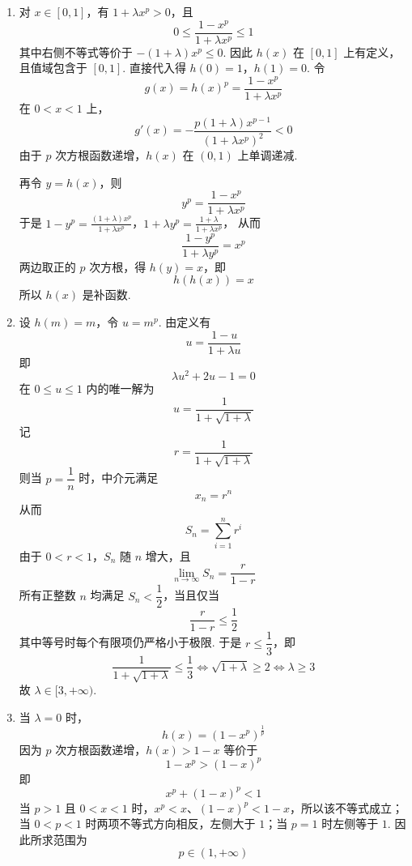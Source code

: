 \begin{solution}
\begin{enumerate}
\item 对 \(x\in[0,1]\)，有 \(1+\lambda x^p>0\)，且
\[
0\leqslant\frac{1-x^p}{1+\lambda x^p}\leqslant1
\]
其中右侧不等式等价于
\(-(1+\lambda)x^p\leqslant0\). 因此 \(h(x)\) 在 \([0,1]\) 上有定义，且值域包含于 \([0,1]\). 直接代入得
\(h(0)=1\)，\(h(1)=0\).
令
\[
g(x)=h(x)^p=\frac{1-x^p}{1+\lambda x^p}
\]
在 \(0<x<1\) 上，
\[
g'(x)
=-\frac{p(1+\lambda)x^{p-1}}{(1+\lambda x^p)^2}<0
\]
由于 \(p\) 次方根函数递增，\(h(x)\) 在 \((0,1)\) 上单调递减.

再令 \(y=h(x)\)，则
\[
y^p=\frac{1-x^p}{1+\lambda x^p}
\]
于是
\(1-y^p=\frac{(1+\lambda)x^p}{1+\lambda x^p}\)，\(1+\lambda y^p=\frac{1+\lambda}{1+\lambda x^p}\)，
从而
\[
\frac{1-y^p}{1+\lambda y^p}=x^p
\]
两边取正的 \(p\) 次方根，得 \(h(y)=x\)，即
\[
h(h(x))=x
\]
所以 \(h(x)\) 是补函数.

\item 设 \(h(m)=m\)，令 \(u=m^p\). 由定义有
\[
u=\frac{1-u}{1+\lambda u}
\]
即
\[
\lambda u^2+2u-1=0
\]
在 \(0\leqslant u\leqslant1\) 内的唯一解为
\[
u=\frac1{1+\sqrt{1+\lambda}}
\]
记
\[
r=\frac1{1+\sqrt{1+\lambda}}
\]
则当 \(p=\dfrac1n\) 时，中介元满足
\[
x_n=r^n
\]
从而
\[
S_n=\sum_{i=1}^nr^i
\]
由于 \(0<r<1\)，\(S_n\) 随 \(n\) 增大，且
\[
\lim_{n\to\infty}S_n=\frac r{1-r}
\]
所有正整数 \(n\) 均满足 \(S_n<\dfrac12\)，当且仅当
\[
\frac r{1-r}\leqslant\frac12
\]
其中等号时每个有限项仍严格小于极限. 于是 \(r\leqslant\dfrac13\)，即
\[
\frac1{1+\sqrt{1+\lambda}}\leqslant\frac13
\Longleftrightarrow \sqrt{1+\lambda}\geqslant2
\Longleftrightarrow \lambda\geqslant3
\]
故 \(\lambda\in[3,+\infty)\).

\item 当 \(\lambda=0\) 时，
\[
h(x)=(1-x^p)^{\frac{1}{p}}
\]
因为 \(p\) 次方根函数递增，\(h(x)>1-x\) 等价于
\[
1-x^p>(1-x)^p
\]
即
\[
x^p+(1-x)^p<1
\]
当 \(p>1\) 且 \(0<x<1\) 时，\(x^p<x\)、\((1-x)^p<1-x\)，所以该不等式成立；当 \(0<p<1\) 时两项不等式方向相反，左侧大于 \(1\)；当 \(p=1\) 时左侧等于 \(1\). 因此所求范围为
\[
p\in(1,+\infty)
\]
\end{enumerate}
\end{solution}
